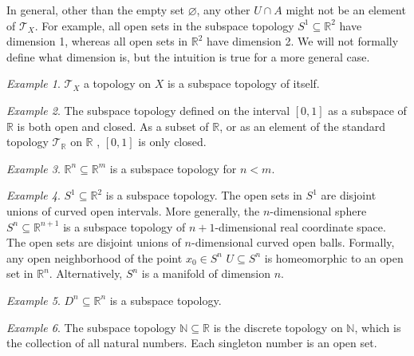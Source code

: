 \documentclass[article,11pt, reqno]{article}
\theoremstyle{remark}
\newtheorem*{example}{Example}
\newcommand{\mb}{\mathbb}
\newcommand{\mc}{\mathcal}
\newcommand{\<}{\langle}
\renewcommand{\>}{\rangle}
\begin{document}
In general, other than the empty set $\varnothing$, any other $U\cap A$ might not be an element of $\mc T_X$. For example, all open sets in the subspace topology $S^1\subseteq \mb R^2$ have dimension 1, whereas all open sets in $\mb R^2$ have dimension 2. We will not formally define what dimension is, but the intuition is true for a more general case.
\begin{example}
    $\mc T_X$ a topology on $X$ is a subspace topology of itself.
\end{example}
\begin{example}
    The subspace topology defined on the interval $[0,1]$ as a subspace of $\mb R$ is both open and closed. As a subset of $\mb R$, or as an element of the standard topology $\mc T_\mb R$ on $\mb R$ , $[0,1]$ is only closed.
\end{example}
\begin{example}
    $\mb R^n\subseteq \mb R^m$ is a subspace topology for $n<m$.
\end{example}
\begin{example}
    $S^1\subseteq \mb R^2$ is a subspace topology. The open sets in $S^1$ are disjoint unions of curved open intervals. More generally, the $n$-dimensional sphere $S^n\subseteq\mb R^{n+1}$ is a subspace topology of $n+1$-dimensional real coordinate space. The open sets are disjoint unions of $n$-dimensional curved open balls. Formally, any open neighborhood of the point $x_0\in S^n$ $U\subseteq S^n$ is homeomorphic to an open set in $\mb R^n$. Alternatively, $S^n$ is a manifold of dimension $n$.
\end{example}
\begin{example}
    $D^n\subseteq\mb R^n$ is a subspace topology.
\end{example}
\begin{example}
    The subspace topology $\mb N\subseteq\mb R$ is the discrete topology on $\mb N$, which is the collection of all natural numbers. Each singleton number is an open set.
\end{example}
\end{document}
